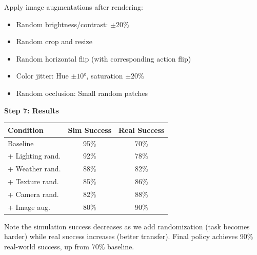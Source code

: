 \begin{example}
Apply image augmentations after rendering:
\begin{itemize}
    \item Random brightness/contrast: $\pm 20\%$
    \item Random crop and resize
    \item Random horizontal flip (with corresponding action flip)
    \item Color jitter: Hue $\pm 10°$, saturation $\pm 20\%$
    \item Random occlusion: Small random patches
\end{itemize}

\textbf{Step 7: Results}

\begin{center}
\begin{tabular}{lcc}
\toprule
\textbf{Condition} & \textbf{Sim Success} & \textbf{Real Success} \\
\midrule
Baseline & 95\% & 70\% \\
+ Lighting rand. & 92\% & 78\% \\
+ Weather rand. & 88\% & 82\% \\
+ Texture rand. & 85\% & 86\% \\
+ Camera rand. & 82\% & 88\% \\
+ Image aug. & 80\% & 90\% \\
\bottomrule
\end{tabular}
\end{center}

Note the simulation success decreases as we add randomization (task becomes harder) while real success increases (better transfer). Final policy achieves 90\% real-world success, up from 70\% baseline.
\end{example}

